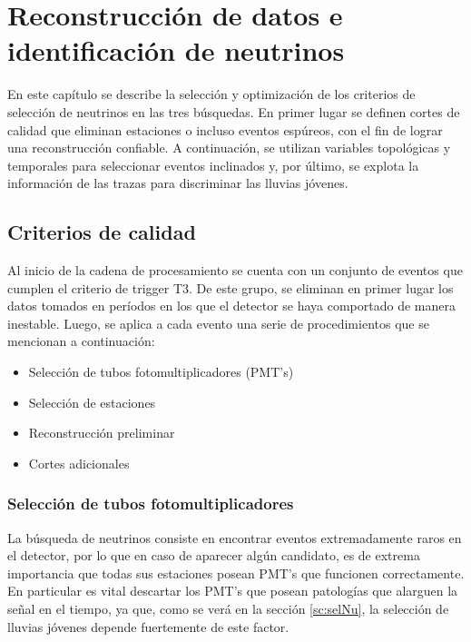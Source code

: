 \chapter{Reconstrucci\'on de datos e identificación de neutrinos}
\label{ch:selAuger}

En este capítulo se describe la selección y optimización de los criterios de selección de neutrinos en las tres búsquedas.
En primer lugar se definen cortes de calidad que eliminan estaciones o incluso eventos espúreos, con el fin de lograr una reconstrucción confiable.
A continuación, se utilizan variables topológicas y temporales para seleccionar eventos inclinados y, por último, se explota la información de las trazas para discriminar las lluvias jóvenes.

\section{Criterios de calidad}
\label{sc:calidadAuger}
	Al inicio de la cadena de procesamiento se cuenta con un conjunto de eventos que cumplen el criterio de trigger T3.
	De este grupo, se eliminan en primer lugar los datos tomados en períodos en los que el detector se haya comportado de manera inestable\cite{pmtsAuger}.
	Luego, se aplica a cada evento una serie de procedimientos que se mencionan a continuación:
	\begin{itemize}
	 \item Selección de tubos fotomultiplicadores (PMT's)
	 \item Selección de estaciones
	 \item Reconstrucción preliminar
	 \item Cortes adicionales
	\end{itemize}
	
	\subsection{Selección de tubos fotomultiplicadores}
	
	La búsqueda de neutrinos consiste en encontrar eventos extremadamente raros en el detector, por lo que en caso de aparecer algún candidato, es de extrema importancia que todas sus estaciones posean PMT's que funcionen correctamente.
	En particular es vital descartar los PMT's que posean patologías que alarguen la señal en el tiempo, ya que, como se verá en la sección \ref{sc:selNu}, la selección de lluvias jóvenes depende fuertemente de este factor.
	
